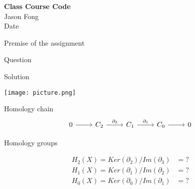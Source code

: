 \documentclass[11pt]{article}
\begin{document}
\begin{center}
\textbf{Class Course Code}\\
Jason Fong\\
Date
\end{center}

Premise of the assignment


Question 


Solution

\texttt{[image: picture.png]}

Homology chain
\[\begin{tikzcd}
	0 & {C_2} & {C_1} & {C_0} & 0
	\arrow[from=1-1, to=1-2]
	\arrow["{\partial_2}", from=1-2, to=1-3]
	\arrow["{\partial_1}", from=1-3, to=1-4]
	\arrow[from=1-4, to=1-5]
\end{tikzcd}\]

Homology groups

\begin{equation*}
    \begin{split}
    H_2 (X) = Ker (\partial_2) / Im(\partial_3) &= ? \\ H_1 (X) = Ker (\partial_1) / Im(\partial_2) &= ? \\ H_0 (X) = Ker (\partial_0) / Im(\partial_1) &= ?
    \end{split}
\end{equation*}
\end{document}
